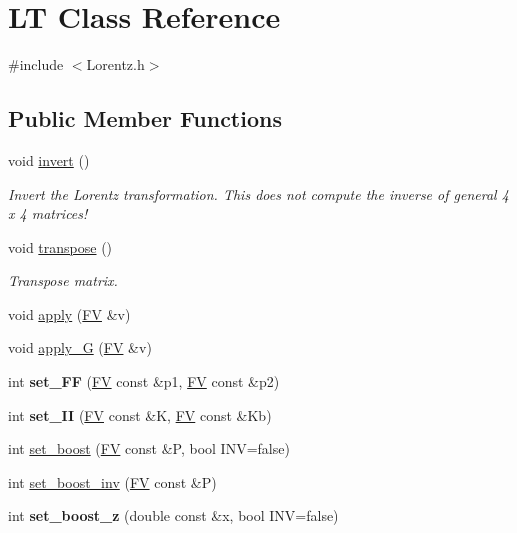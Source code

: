 \hypertarget{classLT}{}\section{L\+T Class Reference}
\label{classLT}


{\ttfamily \#include $<$Lorentz.\+h$>$}

\subsection*{Public Member Functions}
\begin{DoxyCompactItemize}
\item 
\hypertarget{classLT_a7467f60d847896710f21c17be6ee0b2c}{}void \hyperlink{classLT_a7467f60d847896710f21c17be6ee0b2c}{invert} ()\label{classLT_a7467f60d847896710f21c17be6ee0b2c}

\begin{DoxyCompactList}\small\item\em Invert the Lorentz transformation. This does not compute the inverse of general 4 x 4 matrices! \end{DoxyCompactList}\item 
\hypertarget{classLT_a6142dba94f0edc4eb2f8a0cc84a43ada}{}void \hyperlink{classLT_a6142dba94f0edc4eb2f8a0cc84a43ada}{transpose} ()\label{classLT_a6142dba94f0edc4eb2f8a0cc84a43ada}

\begin{DoxyCompactList}\small\item\em Transpose matrix. \end{DoxyCompactList}\item 
void \hyperlink{classLT_a3119b968c2cf6a9bbfb30615c01921d0}{apply} (\hyperlink{classFV}{F\+V} \&v)
\item 
void \hyperlink{classLT_abd17d410a8436a83b03f2dd2909ee59a}{apply\+\_\+\+G} (\hyperlink{classFV}{F\+V} \&v)
\item 
\hypertarget{classLT_acdccba2ab08b071219626bafb85f8e21}{}int {\bfseries set\+\_\+\+F\+F} (\hyperlink{classFV}{F\+V} const \&p1, \hyperlink{classFV}{F\+V} const \&p2)\label{classLT_acdccba2ab08b071219626bafb85f8e21}

\item 
\hypertarget{classLT_ac2718d29c891a91aa5058dc929ffecdd}{}int {\bfseries set\+\_\+\+I\+I} (\hyperlink{classFV}{F\+V} const \&K, \hyperlink{classFV}{F\+V} const \&Kb)\label{classLT_ac2718d29c891a91aa5058dc929ffecdd}

\item 
int \hyperlink{classLT_a0f1f4b9fb6a2b084908abb6bc687cd4f}{set\+\_\+boost} (\hyperlink{classFV}{F\+V} const \&P, bool I\+N\+V=false)
\item 
int \hyperlink{classLT_a84cf79cd6014d4ecc645c1dcc0258b5e}{set\+\_\+boost\+\_\+inv} (\hyperlink{classFV}{F\+V} const \&P)
\item 
\hypertarget{classLT_a7dce276751d25954b2d249516d5191a4}{}int {\bfseries set\+\_\+boost\+\_\+z} (double const \&x, bool I\+N\+V=false)\label{classLT_a7dce276751d25954b2d249516d5191a4}


\end{DoxyCompactItemize}

